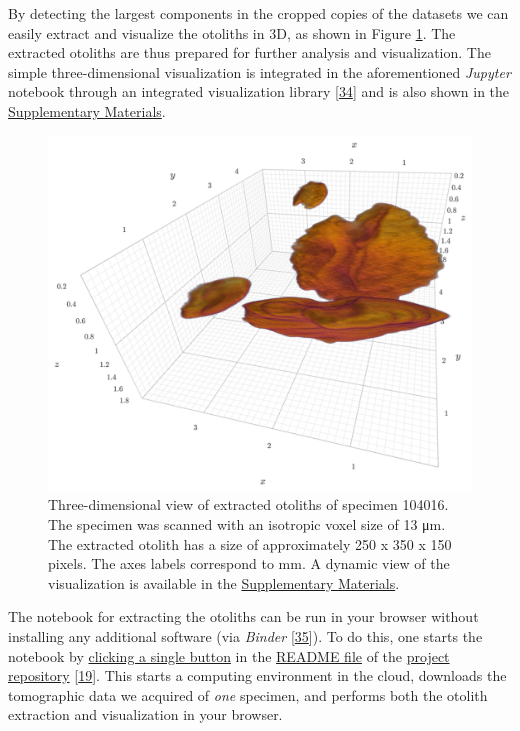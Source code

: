By detecting the largest components in the cropped copies of the datasets we can easily extract and visualize the otoliths in 3D, as shown in Figure \ref{fig:otolith3d}.
The extracted otoliths are thus prepared for further analysis and visualization.
The simple three-dimensional visualization is integrated in the aforementioned \emph{Jupyter} notebook through an integrated visualization library {[}\protect\hyperlink{ref-a9ZL41Of}{34}{]} and is also shown in the \protect\hyperlink{supplementary-materials}{Supplementary Materials}.

\begin{figure}
\hypertarget{fig:otolith3d}{%
\centering
\includegraphics{images/104016.head.rec.otolith.region.3D.png}
\caption{Three-dimensional view of extracted otoliths of specimen 104016.
The specimen was scanned with an isotropic voxel size of 13 μm.
The extracted otolith has a size of approximately 250 x 350 x 150 pixels.
The axes labels correspond to mm.
A dynamic view of the visualization is available in the \protect\hyperlink{supplementary-materials}{Supplementary Materials}.}\label{fig:otolith3d}
}
\end{figure}

The notebook for extracting the otoliths can be run in your browser without installing any additional software (via \emph{Binder} {[}\protect\hyperlink{ref-Q20Bxdsr}{35}{]}).
To do this, one starts the notebook by \href{https://mybinder.org/v2/gh/habi/eawag/HEAD?labpath=ExtractOtoliths.ipynb}{clicking a single button} in the \href{https://github.com/habi/EAWAG/blob/master/README.md}{README file} of the \href{https://github.com/habi/EAWAG}{project repository} {[}\protect\hyperlink{ref-1HteOscVd}{19}{]}.
This starts a computing environment in the cloud, downloads the tomographic data we acquired of \emph{one} specimen, and performs both the otolith extraction and visualization in your browser.

